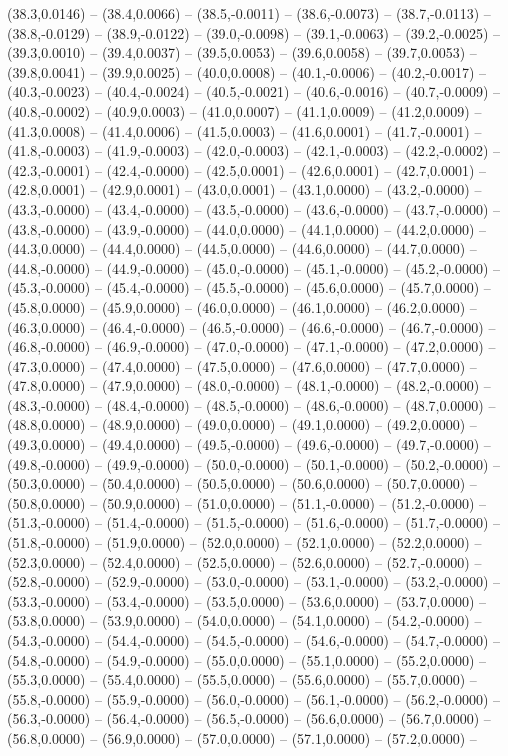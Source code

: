 \documentclass{SVnote}
\begin{document}
(38.3,0.0146) -- (38.4,0.0066) -- (38.5,-0.0011) -- (38.6,-0.0073) -- (38.7,-0.0113) -- (38.8,-0.0129) -- (38.9,-0.0122) -- (39.0,-0.0098) -- (39.1,-0.0063) -- (39.2,-0.0025) -- (39.3,0.0010) -- (39.4,0.0037) -- (39.5,0.0053) -- (39.6,0.0058) -- (39.7,0.0053) -- (39.8,0.0041) -- (39.9,0.0025) -- (40.0,0.0008) -- (40.1,-0.0006) -- (40.2,-0.0017) -- (40.3,-0.0023) -- (40.4,-0.0024) -- (40.5,-0.0021) -- (40.6,-0.0016) -- (40.7,-0.0009) -- (40.8,-0.0002) -- (40.9,0.0003) -- (41.0,0.0007) -- (41.1,0.0009) -- (41.2,0.0009) -- (41.3,0.0008) -- (41.4,0.0006) -- (41.5,0.0003) -- (41.6,0.0001) -- (41.7,-0.0001) -- (41.8,-0.0003) -- (41.9,-0.0003) -- (42.0,-0.0003) -- (42.1,-0.0003) -- (42.2,-0.0002) -- (42.3,-0.0001) -- (42.4,-0.0000) -- (42.5,0.0001) -- (42.6,0.0001) -- (42.7,0.0001) -- (42.8,0.0001) -- (42.9,0.0001) -- (43.0,0.0001) -- (43.1,0.0000) -- (43.2,-0.0000) -- (43.3,-0.0000) -- (43.4,-0.0000) -- (43.5,-0.0000) -- (43.6,-0.0000) -- (43.7,-0.0000) -- (43.8,-0.0000) -- (43.9,-0.0000) -- (44.0,0.0000) -- (44.1,0.0000) -- (44.2,0.0000) -- (44.3,0.0000) -- (44.4,0.0000) -- (44.5,0.0000) -- (44.6,0.0000) -- (44.7,0.0000) -- (44.8,-0.0000) -- (44.9,-0.0000) -- (45.0,-0.0000) -- (45.1,-0.0000) -- (45.2,-0.0000) -- (45.3,-0.0000) -- (45.4,-0.0000) -- (45.5,-0.0000) -- (45.6,0.0000) -- (45.7,0.0000) -- (45.8,0.0000) -- (45.9,0.0000) -- (46.0,0.0000) -- (46.1,0.0000) -- (46.2,0.0000) -- (46.3,0.0000) -- (46.4,-0.0000) -- (46.5,-0.0000) -- (46.6,-0.0000) -- (46.7,-0.0000) -- (46.8,-0.0000) -- (46.9,-0.0000) -- (47.0,-0.0000) -- (47.1,-0.0000) -- (47.2,0.0000) -- (47.3,0.0000) -- (47.4,0.0000) -- (47.5,0.0000) -- (47.6,0.0000) -- (47.7,0.0000) -- (47.8,0.0000) -- (47.9,0.0000) -- (48.0,-0.0000) -- (48.1,-0.0000) -- (48.2,-0.0000) -- (48.3,-0.0000) -- (48.4,-0.0000) -- (48.5,-0.0000) -- (48.6,-0.0000) -- (48.7,0.0000) -- (48.8,0.0000) -- (48.9,0.0000) -- (49.0,0.0000) -- (49.1,0.0000) -- (49.2,0.0000) -- (49.3,0.0000) -- (49.4,0.0000) -- (49.5,-0.0000) -- (49.6,-0.0000) -- (49.7,-0.0000) -- (49.8,-0.0000) -- (49.9,-0.0000) -- (50.0,-0.0000) -- (50.1,-0.0000) -- (50.2,-0.0000) -- (50.3,0.0000) -- (50.4,0.0000) -- (50.5,0.0000) -- (50.6,0.0000) -- (50.7,0.0000) -- (50.8,0.0000) -- (50.9,0.0000) -- (51.0,0.0000) -- (51.1,-0.0000) -- (51.2,-0.0000) -- (51.3,-0.0000) -- (51.4,-0.0000) -- (51.5,-0.0000) -- (51.6,-0.0000) -- (51.7,-0.0000) -- (51.8,-0.0000) -- (51.9,0.0000) -- (52.0,0.0000) -- (52.1,0.0000) -- (52.2,0.0000) -- (52.3,0.0000) -- (52.4,0.0000) -- (52.5,0.0000) -- (52.6,0.0000) -- (52.7,-0.0000) -- (52.8,-0.0000) -- (52.9,-0.0000) -- (53.0,-0.0000) -- (53.1,-0.0000) -- (53.2,-0.0000) -- (53.3,-0.0000) -- (53.4,-0.0000) -- (53.5,0.0000) -- (53.6,0.0000) -- (53.7,0.0000) -- (53.8,0.0000) -- (53.9,0.0000) -- (54.0,0.0000) -- (54.1,0.0000) -- (54.2,-0.0000) -- (54.3,-0.0000) -- (54.4,-0.0000) -- (54.5,-0.0000) -- (54.6,-0.0000) -- (54.7,-0.0000) -- (54.8,-0.0000) -- (54.9,-0.0000) -- (55.0,0.0000) -- (55.1,0.0000) -- (55.2,0.0000) -- (55.3,0.0000) -- (55.4,0.0000) -- (55.5,0.0000) -- (55.6,0.0000) -- (55.7,0.0000) -- (55.8,-0.0000) -- (55.9,-0.0000) -- (56.0,-0.0000) -- (56.1,-0.0000) -- (56.2,-0.0000) -- (56.3,-0.0000) -- (56.4,-0.0000) -- (56.5,-0.0000) -- (56.6,0.0000) -- (56.7,0.0000) -- (56.8,0.0000) -- (56.9,0.0000) -- (57.0,0.0000) -- (57.1,0.0000) -- (57.2,0.0000) -- 
\end{document}
